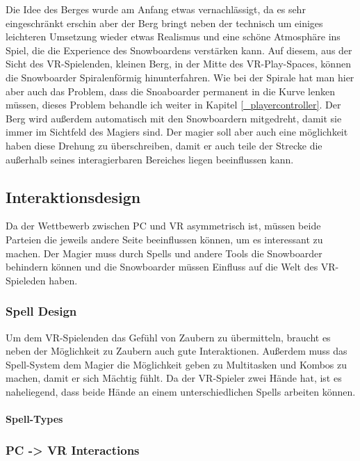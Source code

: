 Die Idee des Berges wurde am Anfang etwas vernachlässigt, da es sehr eingeschränkt erschin aber der Berg bringt neben der technisch um einiges leichteren Umsetzung wieder etwas Realismus und eine schöne Atmosphäre ins Spiel, die die Experience des Snowboardens verstärken kann. Auf diesem, aus der Sicht des VR-Spielenden, kleinen Berg, in der Mitte des VR-Play-Spaces, können die Snowboarder Spiralenförmig hinunterfahren. Wie bei der Spirale hat man hier aber auch das Problem, dass die Snoaboarder permanent in die Kurve lenken müssen, dieses Problem behandle ich weiter in Kapitel \ref{_playercontroller}. Der Berg wird außerdem automatisch mit den Snowboardern mitgedreht, damit sie immer im Sichtfeld des Magiers sind. Der magier soll aber auch eine möglichkeit haben diese Drehung zu überschreiben, damit er auch teile der Strecke die außerhalb seines interagierbaren Bereiches liegen beeinflussen kann.

\subsection{Interaktionsdesign}

Da der Wettbewerb zwischen PC und VR asymmetrisch ist, müssen beide Parteien die jeweils andere Seite beeinflussen können, um es interessant zu machen. Der Magier muss durch Spells und andere Tools die Snowboarder behindern können und die Snowboarder müssen Einfluss auf die Welt des VR-Spieleden haben.

\subsubsection{Spell Design\label{_spell_design}}

Um dem VR-Spielenden das Gefühl von Zaubern zu übermitteln, braucht es neben der Möglichkeit zu Zaubern auch gute Interaktionen. Außerdem muss das Spell-System dem Magier die Möglichkeit geben zu Multitasken und Kombos zu machen, damit er sich Mächtig fühlt. Da der VR-Spieler zwei Hände hat, ist es naheliegend, dass beide Hände an einem unterschiedlichen Spells arbeiten können.

\paragraph{Spell-Types}

\subsubsection{PC -> VR Interactions}

